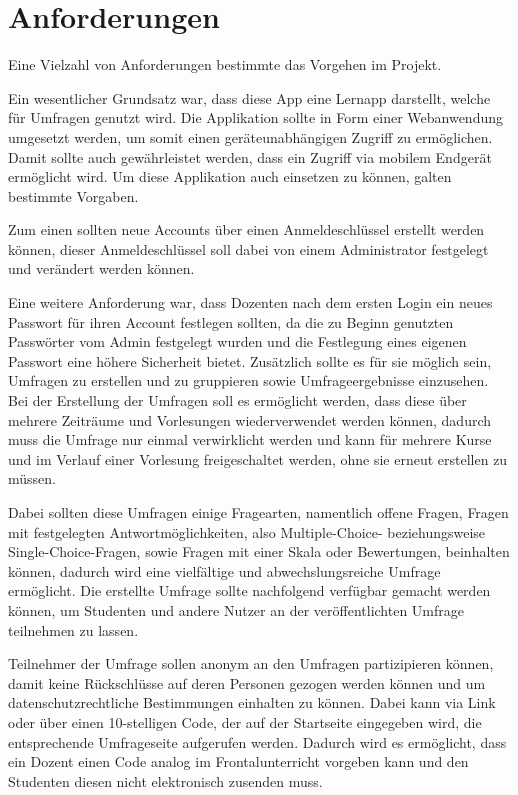 \section{Anforderungen}
\label{sec:Anforderungen}

Eine Vielzahl von Anforderungen bestimmte das Vorgehen im Projekt.

Ein wesentlicher Grundsatz war, dass diese App eine Lernapp darstellt, welche für Umfragen genutzt wird. Die Applikation sollte in Form einer Webanwendung umgesetzt werden, um somit einen geräteunabhängigen Zugriff zu ermöglichen.
Damit sollte auch gewährleistet werden, dass ein Zugriff via mobilem Endgerät ermöglicht wird. 
Um diese Applikation auch einsetzen zu können, galten bestimmte Vorgaben.

Zum einen sollten neue Accounts über einen Anmeldeschlüssel erstellt werden können, dieser Anmeldeschlüssel soll dabei von einem Administrator festgelegt und verändert werden können.

Eine weitere Anforderung war, dass Dozenten nach dem ersten Login ein neues Passwort für ihren Account festlegen sollten, da die zu Beginn genutzten Passwörter vom Admin festgelegt wurden und die Festlegung eines eigenen Passwort eine höhere Sicherheit bietet.
Zusätzlich sollte es für sie möglich sein, Umfragen zu erstellen und zu gruppieren sowie Umfrageergebnisse einzusehen.
Bei der Erstellung der Umfragen soll es ermöglicht werden, dass diese über mehrere Zeiträume und Vorlesungen wiederverwendet werden können, dadurch muss die Umfrage nur einmal verwirklicht werden und kann für mehrere Kurse und im Verlauf einer Vorlesung freigeschaltet werden, ohne sie erneut erstellen zu müssen.

Dabei sollten diese Umfragen einige Fragearten, namentlich offene Fragen, Fragen mit festgelegten Antwortmöglichkeiten, also Multiple-Choice- beziehungsweise Single-Choice-Fragen, sowie Fragen mit einer Skala oder Bewertungen, beinhalten können, dadurch wird eine vielfältige und abwechslungsreiche Umfrage ermöglicht.
Die erstellte Umfrage sollte nachfolgend verfügbar gemacht werden können, um Studenten und andere Nutzer an der veröffentlichten Umfrage teilnehmen zu lassen.

Teilnehmer der Umfrage sollen anonym an den Umfragen partizipieren können, damit keine Rückschlüsse auf deren Personen gezogen werden können und um datenschutzrechtliche Bestimmungen einhalten zu können. Dabei kann via Link oder über einen 10-stelligen Code, der auf der Startseite eingegeben wird, die entsprechende Umfrageseite aufgerufen werden. Dadurch wird es ermöglicht, dass ein Dozent einen Code analog im Frontalunterricht vorgeben kann und den Studenten diesen nicht elektronisch zusenden muss.


